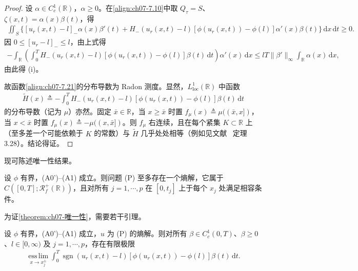 \documentclass[../../main.tex]{subfiles}%
\begin{document}
\begin{proof}
设 $\alpha\in C^1_c(\mathbb{R})$，$\alpha\geqslant0$。在\eqref{align:ch07-7.10}中取 $Q_\tau=S$、$\zeta(x,t)=\alpha(x)\beta(t)$，得
\begin{align*}
\iint_S\{[u_r(x,t)-l]_-\alpha(x)\beta'(t)+H_-(u_r(x,t)-l)[\phi(u_r(x,t))-\phi(l)]\alpha'(x)\beta(t)\}\,\mathrm{d}x\,\mathrm{d}t\geqslant0.
\end{align*}
因 $0\leqslant[u_r-l]_-\leqslant l$，由上式得
\begin{align*}
-\int_{\mathbb{R}}\left(\int_0^T H_-(u_r(x,t)-l)[\phi(u_r(x,t))-\phi(l)]\beta(t)\,\mathrm{d}t\right)\alpha'(x)\,\mathrm{d}x
\leqslant lT\|\beta'\|_\infty\int_{\mathbb{R}}\alpha(x)\,\mathrm{d}x,
\end{align*}
由此得 (i)。

故函数\eqref{align:ch07-7.21}的分布导数为 Radon 测度。显然，$L^1_{\mathrm{loc}}(\mathbb{R})$ 中函数
\begin{align*}
\widetilde H(x)\triangleq -\int_0^T H_-(u_r(x,t)-l)[\phi(u_r(x,t))-\phi(l)]\beta(t)\,\mathrm{d}t
\end{align*}
的分布导数（记为 $\mu$）亦然。固定 $\bar x\in\mathbb{R}$，当 $x\geqslant\bar x$ 时置 $f_\mu(x)\triangleq \mu((\bar x,x])$，当 $x<\bar x$ 时置 $f_\mu(x)\triangleq -\mu((x,\bar x])$。则 $f_\mu$ 右连续，且在每个紧集 $K\subset\mathbb{R}$ 上（至多差一个可能依赖于 $K$ 的常数）与 $\widetilde H$ 几乎处处相等（例如见文献~\cite{ref05} 定理 3.28）。结论得证。
\end{proof}

现可陈述唯一性结果。

\begin{theorem}\label{theorem:ch07-唯一性}
设 $\phi$ 有界，(A0')--(A1) 成立。则问题 (P) 至多存在一个熵解，它属于 $C([0,T];\mathscr{R}_f^+(\mathbb{R}))$，且对所有 $j=1,\cdots ,p$ 在 $[0,t_j]$ 上于每个 $x_j$ 处满足相容条件。
\end{theorem}

为证\cref{theorem:ch07-唯一性}，需要若干引理。

\begin{lemma}\label{lemma:ch07-7.2.5}
设 $\phi$ 有界，(A0')--(A1) 成立，$u$ 为 (P) 的熵解。则对所有 $\beta\in C^1_c(0,T)$、$\beta\geqslant0$、$l\in[0,\infty)$ 及 $j=1,\cdots ,p$，存在有限极限
\begin{align}
\operatorname*{ess\,lim}_{x\to x_j^\pm}\int_0^T\operatorname{sgn}(u_r(x,t)-l)[\phi(u_r(x,t))-\phi(l)]\beta(t)\,\mathrm{d}t. \label{align:ch07-7.23}
\end{align}
\end{lemma}
\end{document}
